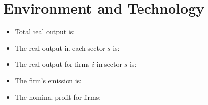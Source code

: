 \documentclass[12pt]{article} %
\begin{document}
\maketitle

\begin{abstract}
        
\end{abstract}

\section*{Environment and Technology}

\begin{itemize}
    \item Total real output is:
    

    \item The real output in each sector $s$ is:
    

    \item The real output for firms $i$ in sector $s$ is:
	
    
	\item The firm's emission is:
	

    \item The nominal profit for firms:
    
    
\end{itemize}
\end{document}
